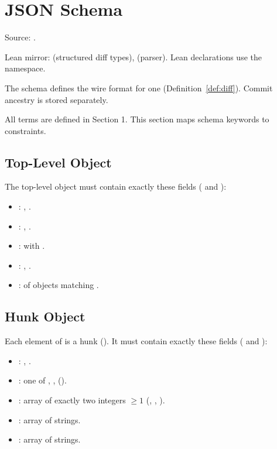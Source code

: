 \section{JSON Schema}

Source: .

Lean mirror:  (structured diff types),  (parser). Lean declarations use the  namespace.

The schema defines the wire format for one  (Definition~\ref{def:diff}). Commit ancestry is stored separately.

All terms are defined in Section 1. This section maps schema keywords to constraints.

\subsection{Top-Level Object}

The top-level object must contain exactly these fields ( and ):

\begin{itemize}
  \item {}: , .
  \item {}: , .
  \item {}:  with .
  \item {}: , .
  \item {}:  of objects matching .
\end{itemize}

\subsection{Hunk Object}

Each element of  is a hunk (). It must contain exactly these fields ( and ):

\begin{itemize}
  \item {}: , .
  \item {}: one of , ,  ().
  \item {}: array of exactly two integers $\geq 1$ (, , ).
  \item {}: array of strings.
  \item {}: array of strings.
\end{itemize}


